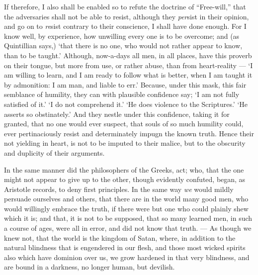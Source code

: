 If therefore, I also shall be enabled so to refute the doctrine of “Free-will,” that the adversaries shall not be able to resist, although they \emph{per}sist in their opinion, and go on to \emph{re}sist contrary to their conscience, I shall have done enough. For I know well, by experience, how unwilling every one is to be overcome; and (as Quintillian says,) ‘that there is no one, who would not rather appear to know, than to be taught.’ Although, now-a-days all men, in all places, have this proverb on their tongue, but more from use, or rather abuse, than from heart-reality — ‘I am willing to learn, and I am ready to follow what is better, when I am taught it by admonition: I am man, and liable to err.’ Because, under this mask, this fair semblance of humility, they can with plausible confidence say; ‘I am not fully satisfied of it.’ ‘I do not comprehend it.’ ‘He does violence to the Scriptures.’ ‘He asserts so obstinately.’ And they nestle under this confidence, taking it for granted, that no one would ever suspect, that souls of so much humility could, ever pertinaciously resist and determinately impugn the known truth. Hence their not yielding in heart, is not to be imputed to their malice, but to the obscurity and duplicity of their arguments.

In the same manner did the philosophers of the Greeks, act; who, that the one might not appear to give up to the other, though evidently confuted, began, as Aristotle records, to deny first principles. In the same way \emph{we }would mildly persuade ourselves and others, that there are in the world many good men, who would willingly embrace the truth, if there were but one who could plainly shew which it is; and that, it is not to be supposed, that so many learned men, in such a course of ages, were all in error, and did not know that truth. — As though we knew not, that the world is the kingdom of Satan, where, in addition to the natural blindness that is engendered in our flesh, and those most wicked spirits also which have dominion over us, we grow hardened in that very blindness, and are bound in a darkness, no longer human, but devilish.


